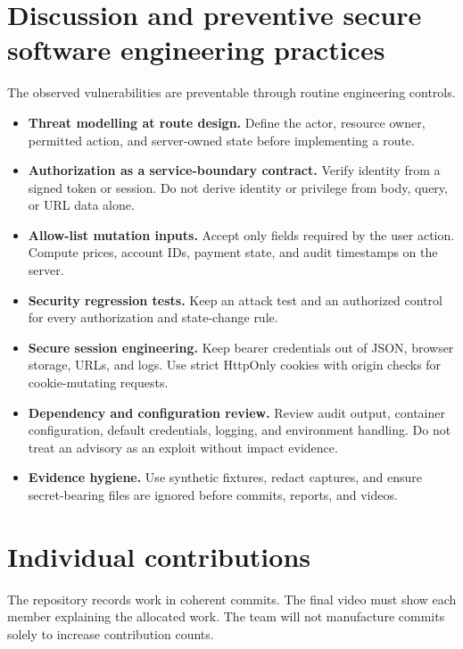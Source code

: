\documentclass[11pt]{article}
\begin{document}
\section{Discussion and preventive secure software engineering practices}\label{sec:prevention}
The observed vulnerabilities are preventable through routine engineering controls.
\begin{itemize}
  \item \textbf{Threat modelling at route design.} Define the actor, resource owner, permitted action, and server-owned state before implementing a route.
  \item \textbf{Authorization as a service-boundary contract.} Verify identity from a signed token or session. Do not derive identity or privilege from body, query, or URL data alone.
  \item \textbf{Allow-list mutation inputs.} Accept only fields required by the user action. Compute prices, account IDs, payment state, and audit timestamps on the server.
  \item \textbf{Security regression tests.} Keep an attack test and an authorized control for every authorization and state-change rule.
  \item \textbf{Secure session engineering.} Keep bearer credentials out of JSON, browser storage, URLs, and logs. Use strict HttpOnly cookies with origin checks for cookie-mutating requests.
  \item \textbf{Dependency and configuration review.} Review audit output, container configuration, default credentials, logging, and environment handling. Do not treat an advisory as an exploit without impact evidence.
  \item \textbf{Evidence hygiene.} Use synthetic fixtures, redact captures, and ensure secret-bearing files are ignored before commits, reports, and videos.
\end{itemize}

\section{Individual contributions}\label{sec:contributions}
The repository records work in coherent commits. The final video must show each member explaining the allocated work. The team will not manufacture commits solely to increase contribution counts.
\end{document}
